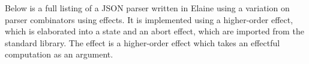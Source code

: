Below is a full listing of a JSON parser written in Elaine using a variation on parser combinators using effects. It is implemented using a higher-order  effect, which is elaborated into a state and an abort effect, which are imported from the standard library. The  effect is a higher-order effect which takes an effectful computation as an argument.

